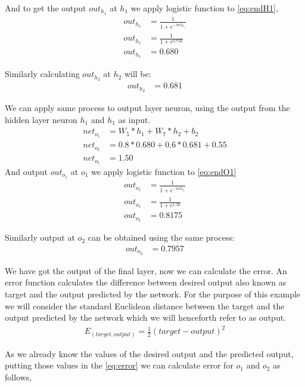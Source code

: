 And to get the output $out_{h_{1}}$ at $h_{1}$ we apply logistic function to \ref{eq:endH1},
\begin{align}
    out_{h_{1}} &= \frac{1}{1+e^{-net_{h_{1}}}}\\
    out_{h_{1}} &=  \frac{1}{1+e^{0.756}}\\
    out_{h_{1}} &= 0.680 \label{eq:outH1}
\end{align}

Similarly calculating $out_{h_{2}}$ at $h_{2}$ will be:
\begin{align}
    out_{h_{2}} &= 0.681
\end{align}

We can apply same process to output layer neuron, using the output from the hidden layer neuron $h_{1}$ and $h_{1}$ as input.
\begin{align}
    net_{o_{1}} &= W_{5} * h_{1} + W_{7} * h_{2} +b_{2} \label{eq:net_out_1}\\
    net_{o_{1}} &= 0.8 *0.680 +0.6 *0.681 +0.55 \\
    net_{o_{1}} &= 1.50 \label{eq:endO1}
\end{align}
And output $out_{o_{1}}$ at $o_{1}$ we apply logistic function to \ref{eq:endO1}
\begin{align}
    out_{o_{1}} &= \frac{1}{1+e^{-net_{o_{1}}}}\\
    out_{o_{1}} &=  \frac{1}{1+e^{1.50}}\\
    out_{o_{1}} &= 0.8175
\end{align}

Similarly output at $o_{2}$ can be obtained using the same process:
\begin{align}
    out_{o_{2}} &= 0.7957
\end{align}

We have got the output of the final layer, now we can calculate the error. An error function calculates the difference between desired output also known as target and the output predicted by the network. For the purpose of this example we will consider the standard Euclidean distance between the target and the output predicted by the network which we will henceforth refer to as output. 
\begin{align}\label{eq:error}
E_{(target, output)} = \frac{1}{2} (target - output)^{2}    
\end{align}

As we already know the values of the desired output and the predicted output, putting those values in the \ref{eq:error} we can calculate error for $o_{1}$ and $o_{2}$ as follows,


